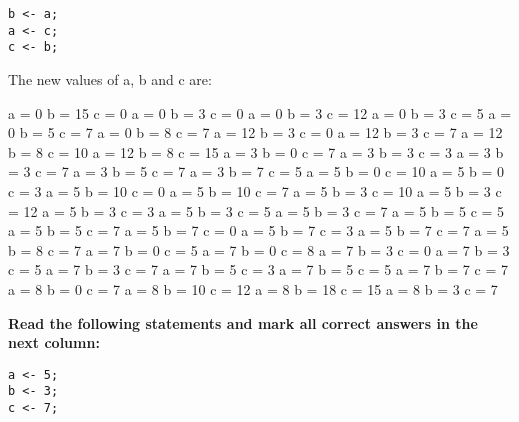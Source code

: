 \documentclass[10pt]{exam}
\begin{document}
\begin{questions}
\begin{minipage}[t][][t]{0.18\textwidth}
\begin{lstlisting}
b <- a;
a <- c;
c <- b;
  \end{lstlisting}
\end{minipage}
  \hfill
\begin{minipage}[t][][t]{0.75\textwidth}
  The new values of a, b and c are:
  \begin{multicols*}{3}
\begin{checkboxes}
    \choice a = 0 b = 15 c = 0
    \choice a = 0 b = 3 c = 0
    \choice a = 0 b = 3 c = 12
    \choice a = 0 b = 3 c = 5
    \choice a = 0 b = 5 c = 7
    \choice a = 0 b = 8 c = 7
    \choice a = 12 b = 3 c = 0
    \choice a = 12 b = 3 c = 7
    \choice a = 12 b = 8 c = 10
    \choice a = 12 b = 8 c = 15
    \choice a = 3 b = 0 c = 7
    \choice a = 3 b = 3 c = 3
    \choice a = 3 b = 3 c = 7
    \choice a = 3 b = 5 c = 7
    \choice a = 3 b = 7 c = 5
    \choice a = 5 b = 0 c = 10
    \choice a = 5 b = 0 c = 3
    \choice a = 5 b = 10 c = 0
    \choice a = 5 b = 10 c = 7
    \choice a = 5 b = 3 c = 10
    \choice a = 5 b = 3 c = 12
    \choice a = 5 b = 3 c = 3
    \choice a = 5 b = 3 c = 5
    \choice a = 5 b = 3 c = 7
    \choice a = 5 b = 5 c = 5
    \choice a = 5 b = 5 c = 7
    \choice a = 5 b = 7 c = 0
    \choice a = 5 b = 7 c = 3
    \choice a = 5 b = 7 c = 7
    \choice a = 5 b = 8 c = 7
    \choice a = 7 b = 0 c = 5
    \choice a = 7 b = 0 c = 8
    \choice a = 7 b = 3 c = 0
    \choice a = 7 b = 3 c = 5
    \choice a = 7 b = 3 c = 7
    \choice a = 7 b = 5 c = 3
    \choice a = 7 b = 5 c = 5
    \choice a = 7 b = 7 c = 7
    \choice a = 8 b = 0 c = 7
    \choice a = 8 b = 10 c = 12
    \choice a = 8 b = 18 c = 15
    \choice a = 8 b = 3 c = 7
  \end{checkboxes}
\end{multicols*}
\end{minipage}

\vspace{1cm}  \begin{minipage}[t][][t]{0.18\textwidth}
    \question \bf Read the following statements and mark all correct answers in the next column: \raggedright
  \begin{lstlisting}
a <- 5;
b <- 3;
c <- 7;


\end{lstlisting}
\end{minipage}
\end{questions}
\end{document}
